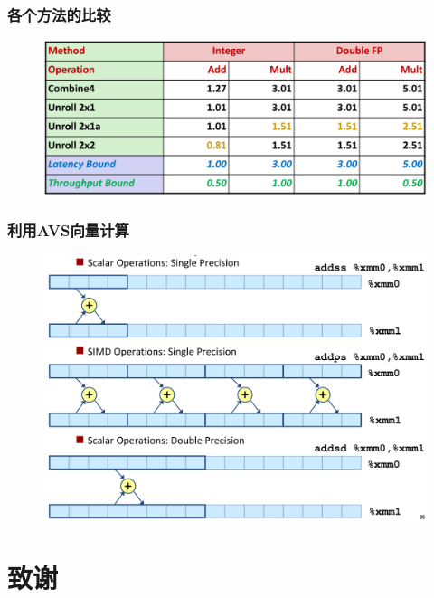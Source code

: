 \documentclass[12pt,AutoFakeBold,aspectratio=43,mathserif]{beamer}
\begin{document}
{\begin{frame}
    \end{frame}

    \begin{frame}
        \frametitle{各个方法的比较}
    
        \begin{figure}
            \includegraphics[width=\textwidth]{figures/16.png}
        \end{figure}
    
    \end{frame}
    
    \begin{frame}
        \frametitle{利用AVS向量计算}
    
        \begin{figure}
            \includegraphics[width=\textwidth]{figures/fpu.png}
        \end{figure}
    
    \end{frame}
    
    \section*{致谢}}
\end{document}
